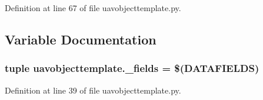 Definition at line 67 of file uavobjecttemplate.\-py.



\subsection{Variable Documentation}
\hypertarget{namespaceuavobjecttemplate_af7e79fb04fe1f45fd33d0ed1479ee3c0}{
\subsubsection[{\-\_\-fields}]{\setlength{\rightskip}{0pt plus 5cm}tuple uavobjecttemplate.\-\_\-fields = \$(D\-A\-T\-A\-F\-I\-E\-L\-D\-S)}}\label{namespaceuavobjecttemplate_af7e79fb04fe1f45fd33d0ed1479ee3c0}


Definition at line 39 of file uavobjecttemplate.\-py.

